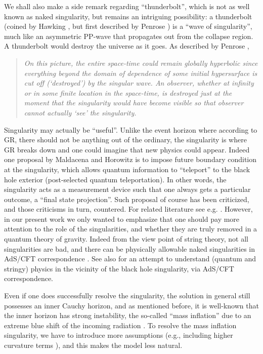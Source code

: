 \documentclass[12pt]{article}
\newcommand{\2}{$^2$}
\newcommand{\3}{$^3$}
\newcommand{\4}{$_4$}
\newcommand{\5}{$_5$}
\begin{document}
We shall also make a side remark regarding ``thunderbolt'', which is not as well known as naked singularity, but remains an intriguing possibility: a thunderbolt (coined by Hawking \cite{Hawking1993}, but first described by Penrose \cite{Penrose1978}) is a ``wave of singularity'', much like an asymmetric PP-wave that propagates out from the collapse region. A thunderbolt would destroy the universe as it goes. As described by Penrose \cite{Penrose1999}, 
\begin{quote}
\emph{On this picture, the entire space-time could remain globally hyperbolic since everything beyond the domain of dependence of some initial hypersurface is cut off (‘destroyed’) by the singular wave. An observer, whether at infinity or in some finite location in the space-time, is destroyed just at the moment that the singularity would have become visible so that observer cannot actually ‘see’ the singularity.}
\end{quote}

Singularity may actually be ``useful''. Unlike the event horizon where according to GR, there should not be anything out of the ordinary, the singularity is where GR breaks down and one could imagine that new physics could appear. Indeed one proposal by Maldacena and Horowitz is to impose future boundary condition at the singularity, which allows quantum information to ``teleport'' to the black hole exterior \cite{MalHor} (post-selected quantum teleportation). In other words, the singularity acts as a measurement device such that one always gets a particular outcome, a ``final state projection''. Such proposal of course has been criticized, and those criticisms in turn, countered. For related literature see e.g. \cite{MH1,MH2,MH3,MH4,MH5}. However, in our present work we only wanted to emphasize that one should pay more attention to the role of the singularities, and whether they are truly removed in a quantum theory of gravity. Indeed from the view point of string theory, not all singularities are bad, and there can be physically allowable naked singularities
in AdS/CFT correspondence \cite{singularity}. See also \cite{0306170} for an attempt to understand (quantum and stringy) physics in the vicinity of the black hole singularity, via AdS/CFT correspondence.

Even if one does successfully resolve the singularity, the solution in general still possesses an inner Cauchy horizon, and as mentioned before, it is well-known that the inner horizon has strong instability, the so-called ``mass inflation'' due to an extreme blue shift of the incoming radiation \cite{Poisson:1990eh}. To resolve the mass inflation singularity, we have to introduce more assumptions (e.g., including higher curvature terms \cite{Hwang:2011kg}), and this makes the model less natural. 
\end{document}
